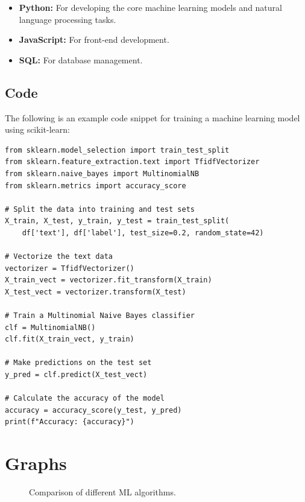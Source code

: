 \begin{itemize}
    \item \textbf{Python:} For developing the core machine learning models and natural language processing tasks.
    \item \textbf{JavaScript:} For front-end development.
    \item \textbf{SQL:} For database management.
\end{itemize}

\subsection{Code}
The following is an example code snippet for training a machine learning model using scikit-learn:

\begin{verbatim}
from sklearn.model_selection import train_test_split
from sklearn.feature_extraction.text import TfidfVectorizer
from sklearn.naive_bayes import MultinomialNB
from sklearn.metrics import accuracy_score

# Split the data into training and test sets
X_train, X_test, y_train, y_test = train_test_split(
    df['text'], df['label'], test_size=0.2, random_state=42)

# Vectorize the text data
vectorizer = TfidfVectorizer()
X_train_vect = vectorizer.fit_transform(X_train)
X_test_vect = vectorizer.transform(X_test)

# Train a Multinomial Naive Bayes classifier
clf = MultinomialNB()
clf.fit(X_train_vect, y_train)

# Make predictions on the test set
y_pred = clf.predict(X_test_vect)

# Calculate the accuracy of the model
accuracy = accuracy_score(y_test, y_pred)
print(f"Accuracy: {accuracy}")
\end{verbatim}

\section{Graphs}

\begin{figure}[H]
    \centering
    \caption{Comparison of different ML algorithms.}
    \label{fig:model_accuracy}
\end{figure}

